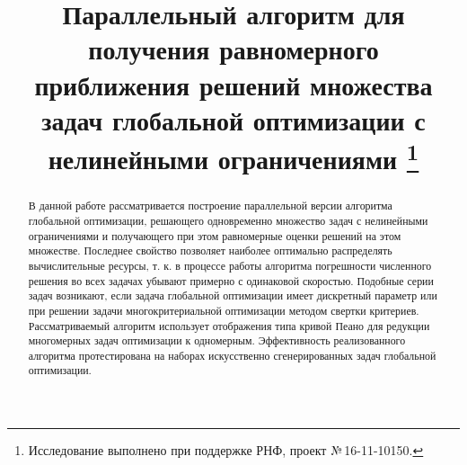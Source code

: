 \documentclass[11pt, oneside, a4paper]{article}
\begin{document}

\title{Параллельный алгоритм для получения равномерного приближения решений множества задач глобальной оптимизации с нелинейными ограничениями
\footnote{Исследование выполнено при поддержке РНФ, проект №\,16-11-10150.}}


\begin{abstract}
В данной работе рассматривается построение параллельной версии алгоритма глобальной оптимизации, решающего одновременно множество задач с нелинейными ограничениями и получающего при этом равномерные оценки решений на этом множестве. Последнее свойство позволяет наиболее оптимально распределять вычислительные ресурсы, т. к. в процессе работы алгоритма погрешности численного решения во всех задачах убывают примерно с одинаковой скоростью. Подобные серии задач возникают, если задача глобальной оптимизации имеет дискретный параметр или при решении задачи многокритериальной оптимизации методом свертки критериев. Рассматриваемый алгоритм использует отображения типа кривой Пеано для редукции многомерных задач оптимизации к одномерным. Эффективность реализованного алгоритма протестирована на наборах искусственно сгенерированных задач глобальной оптимизации.
\end{abstract}


\end{document}
